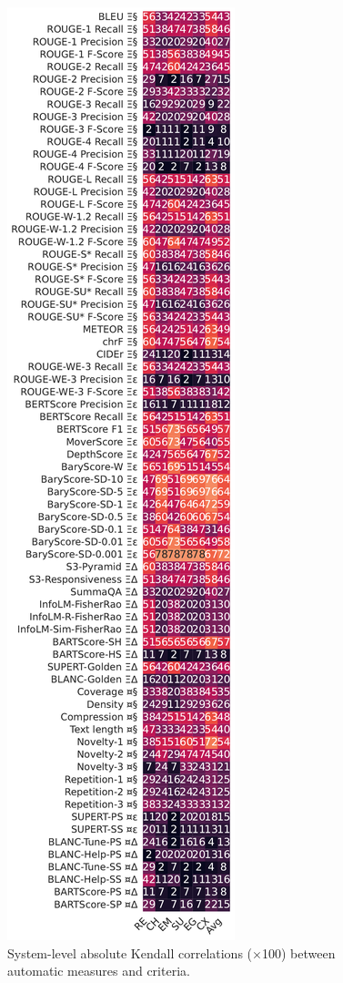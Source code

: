 \begin{figure}[h]
    \centering
    \includegraphics[width=0.375\columnwidth]{pictures/mixed_system_kendall.pdf}
    \caption{System-level absolute Kendall correlations ($\times$100) between automatic measures and criteria.}
    \label{fig:system_level_mixed_correlations_kendall}
\end{figure}

